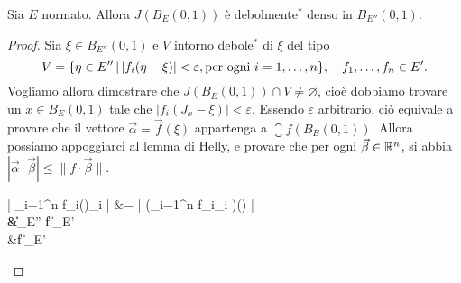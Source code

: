 \begin{lemma}[Goldstein]
	Sia $E$ normato.
	Allora $J(B_E(0,1))$ è debolmente$^*$ denso in $B_{E''}(0,1)$.
\end{lemma}
\begin{proof}
	Sia $\xi \in B_{E''}(0,1)$ e $V$ intorno debole$^*$ di $\xi$ del tipo
	\begin{equation*}
		V = \{ \eta \in E'' \,|\, |f_i(\eta-\xi)| < \varepsilon, \text{per ogni $i=1,\ldots,n$} \}, \quad f_1, \ldots, f_n \in E'.
	\end{equation*}
	Vogliamo allora dimostrare che $J(B_E(0,1)) \cap V \neq \varnothing$, cioè dobbiamo trovare un $x \in B_E(0,1)$ tale che $|f_i(J_x - \xi)| < \varepsilon$. Essendo $\varepsilon$ arbitrario, ciò equivale a provare che il vettore $\vec\alpha = \vec f(\xi)$ appartenga a $\closure{f(B_E(0,1))}$. Allora possiamo appoggiarci al lemma di Helly, e provare che per ogni $\vec\beta \in \mathbb{R}^n$, si abbia $|\vec\alpha \cdot \vec\beta| \leq \|f \cdot \vec\beta\|$.
	\begin{eqalign*}
		\left| \sum_{i=1}^n f_i(\xi)\beta_i \right| &= \left| \left(\sum_{i=1}^n f_i\beta_i \right)(\xi) \right|\\
		&\leq \|\xi\|_{E''} \|f \cdot \beta\|_{E'}\\
		&\leq \|f \cdot \beta\|_{E'} 
	\end{eqalign*}
\end{proof}

